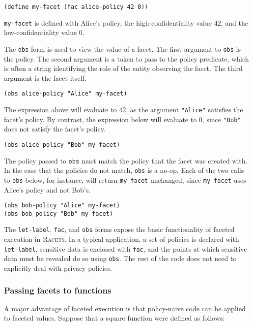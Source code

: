 \documentclass{article}
\begin{document}
\begin{lstlisting}
(define my-facet (fac alice-policy 42 0))
\end{lstlisting}

\texttt{my-facet} is defined with Alice's policy, the high-confidentiality value $42$, and the low-confidentiality value $0$.

The \texttt{obs} form is used to view the value of a facet. The first argument to \texttt{obs} is the policy. The second argument is a token to pass to the policy predicate, which is often a string identifying the role of the entity observing the facet. The third argument is the facet itself.

\begin{lstlisting}
(obs alice-policy "Alice" my-facet)
\end{lstlisting}

The expression above will evaluate to $42$, as the argument \texttt{"Alice"} satisfies the facet's policy. By contrast, the expression below will evaluate to $0$, since \texttt{"Bob"} does not satisfy the facet's policy.

\begin{lstlisting}
(obs alice-policy "Bob" my-facet)
\end{lstlisting}

The policy passed to \texttt{obs} must match the policy that the facet was created with. In the case that the policies do not match, \texttt{obs} is a no-op. Each of the two calls to \texttt{obs} below, for instance, will return \texttt{my-facet} unchanged, since \texttt{my-facet} uses Alice's policy and not Bob's.

\begin{lstlisting}
(obs bob-policy "Alice" my-facet)
(obs bob-policy "Bob" my-facet)
\end{lstlisting}

The \texttt{let-label}, \texttt{fac}, and \texttt{obs} forms expose the basic functionality of faceted execution in \textsc{Racets}. In a typical application, a set of policies is declared with \texttt{let-label}, sensitive data is enclosed with \texttt{fac}, and the points at which sensitive data must be revealed do so using \texttt{obs}. The rest of the code does not need to explicitly deal with privacy policies.


\subsubsection{Passing facets to functions}
A major advantage of faceted execution is that policy-naive code can be applied to faceted values. Suppose that a square function were defined as follows:
\end{document}
